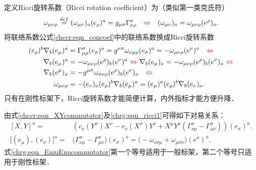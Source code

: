 定义{\heiti Ricci旋转系数}（Ricci rotation coefficient）为（类似第一类克氏符）
\begin{equation}\label{chrg:eqn_ricci0}
    \omega_{\mu\nu\rho} \overset{def}{=} (\omega_{\mu\nu})_a (e_\rho)^{a}
    =g_{\mu\sigma}\Gamma^{\sigma}_{\nu\rho}
    {\quad \color{red} \Leftrightarrow \quad}
    (\omega_{\mu\nu})_a  = \omega_{\mu\nu\rho} (e^\rho)_{a} .
\end{equation}
将联络系数公式\eqref{chccr:eqn_concoef}中的联络系数换成Ricci旋转系数
\begin{align}
    (e_\rho)^b \nabla _b (e_\mu)^a & = \Gamma^{\sigma}_{\mu\rho} (e_\sigma)^a
    = g^{\nu\sigma}\omega_{\nu\mu\rho} (e_\sigma)^a =-\omega_{\mu\nu\rho} (e^\nu)^a
    {\quad \color{red} \Leftrightarrow }  \label{chrg:eqn_ricci1} \\
    \nabla _b (e_\mu)^a & = -\omega_{\mu\nu\rho} (e^\rho)_b (e^\nu)^a
    {\ \color{red} \Leftrightarrow \ }
    \nabla _b (e_\mu)_a   = -\omega_{\mu\nu\rho}(e^\rho)_b (e^\nu)_a
    {\ \color{red} \Leftrightarrow }  \label{chrg:eqn_ricci3}  \\
    \nabla _b (e^\mu)_a & = -g^{\mu\sigma}\omega_{\sigma\nu\rho}(e^\rho)_b (e^\nu)_a
    {\quad \color{red} \Leftrightarrow }  \label{chrg:eqn_ricci4}  \\
    \omega_{\mu\nu\rho} & = -(e_\nu)_a (e_\rho)^b \nabla _b (e_\mu)^a
    = (e_\mu)^a  (e_\rho)^b \nabla _b (e_\nu)_a . \label{chrg:eqn_ricci5}
\end{align}
只有在刚性标架下，Ricci旋转系数才能简便计算，内外指标才能方便升降．


由式\eqref{chccr:eqn_XYcommutator}及\eqref{chrg:eqn_ricci1}可得如下对易关系：
\begin{align}
    \left[ {X,Y} \right]^a =&\left(e_\nu (Y^\sigma)X^\nu  -  e_\nu (X^\sigma) Y^\nu
    + X^\mu Y^\nu ( \Gamma^{\sigma}_{\nu\mu} - \Gamma^{\sigma}_{\mu\nu}) \right)(e_\sigma)^a .
      \label{chrg:eqn_XYcommutator-Ebase} \\
    \bigl[(e_\mu), (e_\nu)\bigr]^a
    =& \bigl(\Gamma^{\sigma}_{\nu\mu} - \Gamma^{\sigma}_{\mu\nu}\bigr) (e_\sigma)^a
    = \bigl(-\omega_{\nu\sigma\mu} + \omega_{\mu\sigma\nu}\bigr) (e^\sigma)^a .
      \label{chrg:eqn_EmuEnucommutator}
\end{align}
式\eqref{chrg:eqn_EmuEnucommutator}第一个等号适用于一般标架，第二个等号只适用于刚性标架． %

